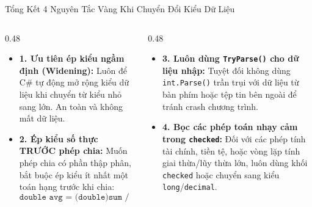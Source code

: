 \documentclass[aspectratio=169, 10pt]{beamer}
\begin{document}
\begin{frame}{Tổng Kết 4 Nguyên Tắc Vàng Khi Chuyển Đổi Kiểu Dữ Liệu}
  \begin{columns}[T]
    \begin{column}{0.48\textwidth}
      \begin{tcolorbox}[colback=UniLightBlue!30,colframe=UniBlue,title=\textbf{Nguyên Tắc 1 \& 2},fonttitle=\small\bfseries]
        \begin{itemize}\small
          \item \textbf{1. Ưu tiên ép kiểu ngầm định (Widening):}
            Luôn để C\# tự động mở rộng kiểu dữ liệu khi chuyển từ kiểu nhỏ sang lớn. An toàn và không mất dữ liệu.
          \item \textbf{2. Ép kiểu số thực TRƯỚC phép chia:}
            Muốn phép chia có phần thập phân, bắt buộc ép kiểu ít nhất một toán hạng trước khi chia:
            $$\texttt{double avg = (double)sum / count;}$$
        \end{itemize}
      \end{tcolorbox}
    \end{column}

    \begin{column}{0.48\textwidth}
      \begin{tcolorbox}[colback=UniGreen!10,colframe=UniGreen,title=\textbf{Nguyên Tắc 3 \& 4},fonttitle=\small\bfseries]
        \begin{itemize}\small
          \item \textbf{3. Luôn dùng \texttt{TryParse()} cho dữ liệu nhập:}
            Tuyệt đối không dùng \texttt{int.Parse()} trần trụi với dữ liệu từ bàn phím hoặc tệp tin bên ngoài để tránh crash chương trình.
          \item \textbf{4. Bọc các phép toán nhạy cảm trong \texttt{checked}:}
            Đối với các phép tính tài chính, tiền tệ, hoặc vòng lặp tính giai thừa/lũy thừa lớn, luôn dùng khối \texttt{checked} hoặc chuyển sang kiểu \texttt{long}/\texttt{decimal}.
        \end{itemize}
      \end{tcolorbox}
    \end{column}
  \end{columns}
\end{frame}
\end{document}
